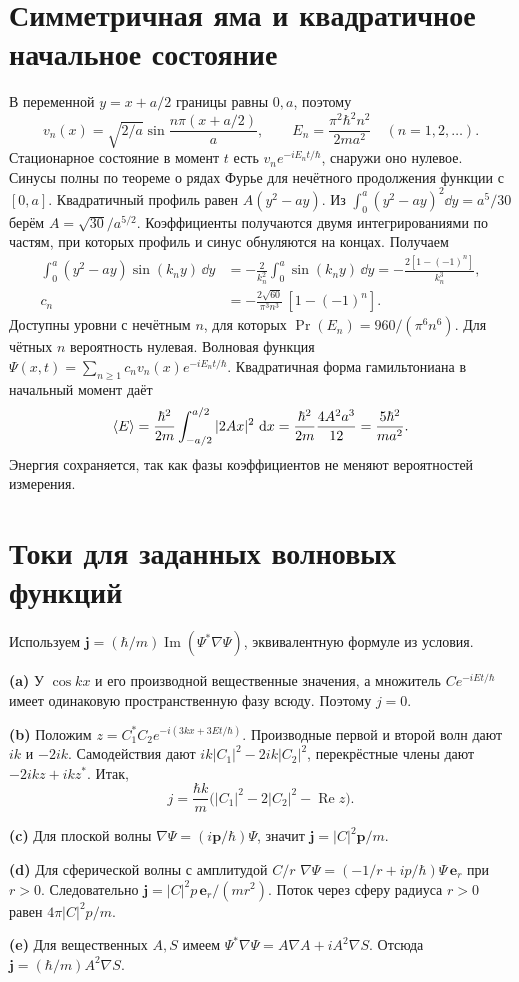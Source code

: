 \documentclass[11pt,a4paper]{article}
\begin{document}
\section{Симметричная яма и квадратичное начальное состояние}

В переменной \(y=x+a/2\) границы равны \(0,a\), поэтому
\[
 v_n(x)=\sqrt{2/a}\sin\!\frac{n\pi(x+a/2)}a,\qquad
 E_n=\frac{\pi^2\hbar^2 n^2}{2ma^2}\quad (n=1,2,\ldots).
\]
Стационарное состояние в момент \(t\) есть \(v_n e^{-iE_nt/\hbar}\),
снаружи оно нулевое. Синусы полны по теореме о
рядах Фурье для нечётного продолжения функции с \([0,a]\).
Квадратичный профиль равен \(A(y^2-ay)\).
Из \(\int_0^a(y^2-ay)^2\dd y=a^5/30\) берём \(A=\sqrt{30}/a^{5/2}\).
Коэффициенты получаются двумя интегрированиями по частям, при
которых профиль и синус обнуляются на концах. Получаем
\begin{align*}
 \int_0^a(y^2-ay)\sin(k_n y)\,\dd y
   &=-\frac{2}{k_n^2}\int_0^a\sin(k_n y)\,\dd y
     =-\frac{2[1-(-1)^n]}{k_n^3},\\
 c_n&=-\frac{2\sqrt{60}}{\pi^3 n^3}\,[1-(-1)^n].
\end{align*}
Доступны уровни с нечётным \(n\), для которых
\(\Pr(E_n)=960/(\pi^6n^6)\). Для чётных \(n\) вероятность нулевая.
Волновая функция \(\Psi(x,t)=\sum_{n\ge1}c_n v_n(x)e^{-iE_nt/\hbar}\).
Квадратичная форма гамильтониана в начальный момент даёт
\[
 \langle E\rangle=\frac{\hbar^2}{2m}\int_{-a/2}^{a/2}|2Ax|^2\,\mathop{}\!\mathrm{d} x
        =\frac{\hbar^2}{2m}\frac{4A^2a^3}{12}
        =\frac{5\hbar^2}{ma^2}.
\]
Энергия сохраняется, так как фазы коэффициентов не меняют
вероятностей измерения.

\section{Токи для заданных волновых функций}

Используем \(\mathbf j=(\hbar/m)\operatorname{Im}(\Psi^*\nabla\Psi)\),
эквивалентную формуле из условия.

\textbf{(a)} У \(\cos kx\) и его производной вещественные значения,
а множитель \(Ce^{-iEt/\hbar}\) имеет одинаковую пространственную
фазу всюду. Поэтому \(j=0\).

\textbf{(b)} Положим \(z=C_1^*C_2e^{-i(3kx+3Et/\hbar)}\).
Производные первой и второй волн дают \(ik\) и \(-2ik\).
Самодействия дают \(ik|C_1|^2-2ik|C_2|^2\), перекрёстные члены
дают \(-2ikz+ikz^*\). Итак,
\[
 j=\frac{\hbar k}{m}\bigl(|C_1|^2-2|C_2|^2-\operatorname{Re}z\bigr).
\]

\textbf{(c)} Для плоской волны
\(\nabla\Psi=(i\mathbf p/\hbar)\Psi\), значит
\(\mathbf j=|C|^2\mathbf p/m\).

\textbf{(d)} Для сферической волны с амплитудой \(C/r\)
\(\nabla\Psi=(-1/r+ip/\hbar)\Psi\,\mathbf e_r\) при \(r>0\).
Следовательно \(\mathbf j=|C|^2p\,\mathbf e_r/(mr^2)\).
Поток через сферу радиуса \(r>0\) равен \(4\pi |C|^2p/m\).

\textbf{(e)} Для вещественных \(A,S\) имеем
\(\Psi^*\nabla\Psi=A\nabla A+iA^2\nabla S\).
Отсюда \(\mathbf j=(\hbar/m) A^2\nabla S\).
\end{document}
